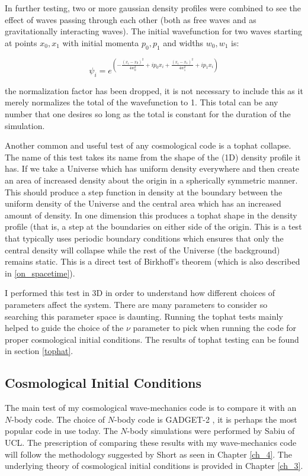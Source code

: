 In further testing, two or more gaussian density profiles were combined to see the effect of waves passing through each other (both as free waves and as gravitationally interacting waves). The initial wavefunction for two waves starting at points $x_0, x_1$ with initial momenta $p_0, p_1$ and widths $w_0, w_1$ is:

\begin{equation}
\psi_i =  e^{\left( -\frac{(x_i-x_0)^2}{4 w_0^2} + i p_0 x_i + \frac{(x_i-x_1)^2}{4 w_1^2} + i p_1 x_i \right) }
\end{equation}

\noindent the normalization factor has been dropped, it is not necessary to include this as it merely normalizes the total of the wavefunction to 1. This total can be any number that one desires so long as the total is constant for the duration of the simulation.

Another common and useful test of any cosmological code is a tophat collapse. The name of this test takes its name from the shape of the (1D) density profile it has. If we take a Universe which has uniform density everywhere and then create an area of increased density about the origin in a spherically symmetric manner. This should produce a step function in density at the boundary between the uniform density of the Universe and the central area which has an increased amount of density. In one dimension this produces a tophat shape in the density profile (that is, a step at the boundaries on either side of the origin. This is a test that typically uses periodic boundary conditions which ensures that only the central density will collapse while the rest of the Universe (the background) remains static. This is a direct test of Birkhoff's theorem (which is also described in \ref{on_spacetime}).

I performed this test in 3D in order to understand how different choices of parameters affect the system. There are many parameters to consider so searching this parameter space is daunting. Running the tophat tests mainly helped to guide the choice of the $\nu$ parameter to pick when running the code for proper cosmological initial conditions. The results of tophat testing can be found in section \ref{tophat}.

\subsection{Cosmological Initial Conditions}
The main test of my cosmological wave-mechanics code is to compare it with an $N$-body code. The choice of $N$-body code is GADGET-2 \citep{bib_spr}, it is perhaps the most popular code in use today. The $N$-body simulations were performed by Sabiu of UCL. The prescription of comparing these results with my wave-mechanics code will follow the methodology suggested by Short as seen in Chapter \ref{ch_4}. The underlying theory of cosmological initial conditions is provided in Chapter \ref{ch_3}.

